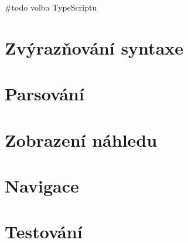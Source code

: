 \#todo volba TypeScriptu

\section{Zvýrazňování syntaxe}


\section{Parsování}


\section{Zobrazení náhledu}


\section{Navigace}


\section{Testování}

